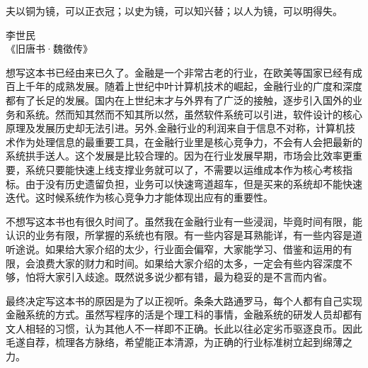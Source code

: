 \epigraph{夫以铜为镜，可以正衣冠；以史为镜，可以知兴替；以人为镜，可以明得失。}{李世民 \\ 《旧唐书·魏徵传》}

想写这本书已经由来已久了。金融是一个非常古老的行业，在欧美等国家已经有成百上千年的成熟发展。随着上世纪中叶计算机技术的崛起，金融行业的广度和深度都有了长足的发展。国内在上世纪末才与外界有了广泛的接触，逐步引入国外的业务和系统。然而知其然而不知其所以然，虽然软件系统可以引进，软件设计的核心原理及发展历史却无法引进。另外,金融行业的利润来自于信息不对称，计算机技术作为处理信息的最重要工具，在金融行业里是核心竞争力，不会有人会把最新的系统拱手送人。这个发展是比较合理的。因为在行业发展早期，市场会比效率更重要，系统只要能快速上线支撑业务就可以了，不需要以运维成本作为核心考核指标。由于没有历史遗留负担，业务可以快速弯道超车，但是买来的系统却不能快速迭代。这时候系统作为核心竞争力才能体现出应有的重要性。


不想写这本书也有很久时间了。虽然我在金融行业有一些浸润，毕竟时间有限，能认识的业务有限，所掌握的系统也有限。有一些内容是耳熟能详，有一些内容是道听途说。如果给大家介绍的太少，行业面会偏窄，大家能学习、借鉴和运用的有限，会浪费大家的财力和时间。如果给大家介绍的太多，一定会有些内容深度不够，怕将大家引入歧途。既然说多说少都有错，最为稳妥的是不言而内省。


最终决定写这本书的原因是为了以正视听。条条大路通罗马，每个人都有自己实现金融系统的方式。虽然写程序的活是个理工科的事情，金融系统的研发人员却都有文人相轻的习惯，认为其他人不一样即不正确。长此以往必定劣币驱逐良币。因此毛遂自荐，梳理各方脉络，希望能正本清源，为正确的行业标准树立起到绵薄之力。
\newline{}
\newline{}


